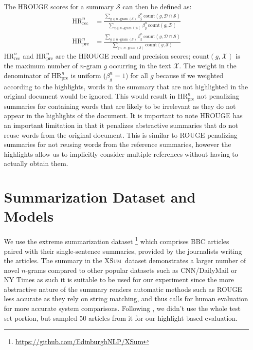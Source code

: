 \documentclass[11pt,a4paper]{article}
\newcommand\xsum{\textsc{XSum}}
\newcommand\hrouge{\textsc{HROUGE}}
\newcommand\rouge{\textsc{ROUGE}}
\begin{document}
The HROUGE scores for a summary $\mathcal{S}$ can then be defined as:
\begin{align}
    \text{HR}_{\mathrm{rec}}^n &= \frac{\displaystyle\sum_{g \in n\operatorname{-gram}(\mathcal{S})} \beta_g^n\, \text{count}(g, \mathcal{D} \cap \mathcal{S})}{\displaystyle\sum_{g \in n\operatorname{-gram}(\mathcal{D})} \beta_g^n\,\text{count}(g, \mathcal{D})} \\
    \text{HR}_{\mathrm{pre}}^n &= \frac{\displaystyle\sum_{g \in n\operatorname{-gram}(\mathcal{S})} \beta_g^n\, \text{count}(g, \mathcal{D} \cap \mathcal{S})}{\displaystyle\sum_{g \in n\operatorname{-gram}(\mathcal{S})} \text{count}(g, \mathcal{S})}
\end{align}
\noindent $\text{HR}_{\mathrm{rec}}^n$ and $\text{HR}_{\mathrm{pre}}^n$ are the HROUGE recall and precision scores; $\text{count}(g, \mathcal{X})$ is the maximum number of $n$-gram $g$ occurring in the text $\mathcal{X}$. The weight in the denominator of $\text{HR}_{\mathrm{pre}}^n$ is uniform ($\beta^n_g = 1$) for all $g$ because if we weighted according to the highlights, words in the summary that are not highlighted in the original document would be ignored. This would result in $\text{HR}_{\mathrm{pre}}^n$ not penalizing summaries for containing words that are likely to be irrelevant as they do not appear in the highlights of the document. It is important to note \hrouge{} has an important limitation in that it penalizes abstractive summaries that do not reuse words from the original document. This is similar to \rouge{} penalizing summaries for not reusing words from the reference summaries, however the highlights allow us to implicitly consider multiple references without having to actually obtain them.  %

\section{Summarization Dataset and Models}
\label{sec:data-models}

We use the extreme summarization dataset \citep[\xsum,][]{narayan18xsum}\footnote{\url{https://github.com/EdinburghNLP/XSum}} which comprises BBC articles paired with their single-sentence summaries, provided by the journalists writing the articles. The summary in the \xsum\ dataset demonstrates a larger number of novel $n$-grams compared to other popular datasets such as CNN/DailyMail \citep{Hermann2015} or NY Times \citep{Sandhaus2008} as such it is suitable to be used for our experiment since the more abstractive nature of the summary renders automatic methods such as ROUGE less accurate as they rely on string matching, and thus calls for human evaluation for more accurate system comparisons. Following \citet{narayan18xsum}, we didn't use the whole test set portion, but sampled 50 articles from it for our highlight-based evaluation.  
\end{document}
